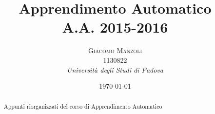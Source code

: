 \documentclass[a4paper, 11pt]{article} %
\title{\textbf{Apprendimento Automatico}\\ %
A.A. 2015-2016} %
\author{\textsc{Giacomo Manzoli}
\\ 1130822 %
\\{\textit{Università degli Studi di Padova}}} %
\date{\today} %
\makeatletter
\renewcommand{\maketitle}{ %
\begin{flushright} %
{\LARGE\@title} %

\vspace{50pt} %

{\large\@author} %
\\\@date %

\vspace{100pt} %
\end{flushright}
}
\makeatother
\begin{document}
\maketitle %



\begin{abstract}
Appunti riorganizzati del corso di Apprendimento Automatico

\end{abstract}

\clearpage
\tableofcontents


\vspace{30pt} %

\clearpage




















%
%
\end{document}
